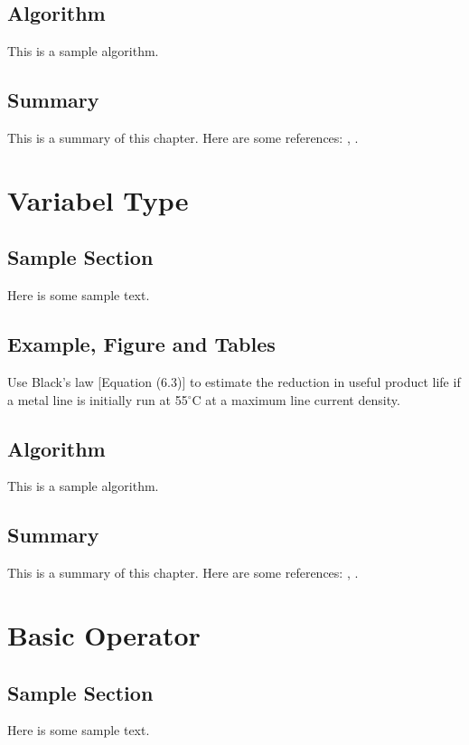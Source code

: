 \documentclass{wileySix}
\begin{document}
\section{Algorithm}
This is a sample algorithm.

\section{Summary}
This is a summary of this chapter.
Here are some references: \cite{xkilby}, \cite{xberen}.

\chapter{Variabel Type}

\section{Sample Section}
Here is some sample text.

\section{Example, Figure and Tables}
\vskip6pt
\begin{example}
	Use Black's law [Equation (6.3)] to estimate the reduction in useful product
	life if a metal line is initially run at 55$^\circ$C at a maximum line
	current density.
\end{example}

\section{Algorithm}
This is a sample algorithm.

\section{Summary}
This is a summary of this chapter.
Here are some references: \cite{xkilby}, \cite{xberen}.

\chapter{Basic Operator}

\section{Sample Section}
Here is some sample text.
\end{document}
